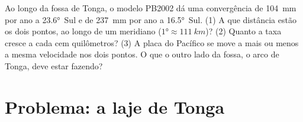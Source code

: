 \begin{exercise}[$\star\star\star$]\label{exo:g11:subduction-zones:15}
Ao longo da fossa de Tonga, o modelo PB2002 dá uma convergência de
\qty{104}{mm} por ano a \ang{23.6}~Sul e de \qty{237}{mm} por ano a
\ang{16.5}~Sul. (1) A que distância estão os dois pontos, ao longo de um
meridiano ($\ang{1} \approx \qty{111}{km}$)? (2) Quanto a taxa cresce a cada
cem quilômetros? (3) A placa do Pacífico se move a mais ou menos a mesma
velocidade nos dois pontos. O que o outro lado da fossa, o arco de Tonga,
deve estar fazendo?
\end{exercise}

\section{Problema: a laje de Tonga}

